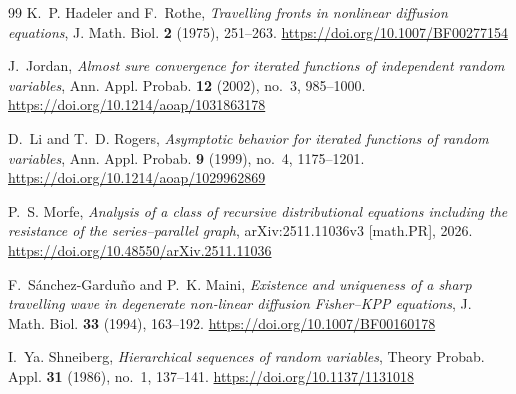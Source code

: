 \documentclass[12pt,preprint]{amsart}
\numberwithin{equation}{section}
\theoremstyle{plain}
\theoremstyle{definition}
\begin{document}
\begin{thebibliography}{99}
K.~P. Hadeler and F.~Rothe,
\emph{Travelling fronts in nonlinear diffusion equations},
J. Math. Biol. \textbf{2} (1975), 251--263.
\url{https://doi.org/10.1007/BF00277154}

J.~Jordan,
\emph{Almost sure convergence for iterated functions of independent random
variables},
Ann. Appl. Probab. \textbf{12} (2002), no.~3, 985--1000.
\url{https://doi.org/10.1214/aoap/1031863178}

D.~Li and T.~D. Rogers,
\emph{Asymptotic behavior for iterated functions of random variables},
Ann. Appl. Probab. \textbf{9} (1999), no.~4, 1175--1201.
\url{https://doi.org/10.1214/aoap/1029962869}

P.~S. Morfe,
\emph{Analysis of a class of recursive distributional equations including the
resistance of the series--parallel graph},
arXiv:2511.11036v3 [math.PR], 2026.
\url{https://doi.org/10.48550/arXiv.2511.11036}

F.~S\'anchez-Gardu\~no and P.~K. Maini,
\emph{Existence and uniqueness of a sharp travelling wave in degenerate
non-linear diffusion Fisher--KPP equations},
J. Math. Biol. \textbf{33} (1994), 163--192.
\url{https://doi.org/10.1007/BF00160178}

I.~Ya. Shneiberg,
\emph{Hierarchical sequences of random variables},
Theory Probab. Appl. \textbf{31} (1986), no.~1, 137--141.
\url{https://doi.org/10.1137/1131018}

\end{thebibliography}
\end{document}

